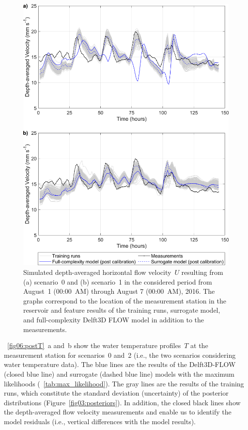 \documentclass[draft,linenumbers,onecolumn]{agujournal2019} %
\begin{document}
\begin{figure}
	\centering
	\includegraphics[width=14.5cm]{post-U-xscenario.png} 
	\caption{Simulated depth-averaged horizontal flow velocity~$U$ resulting from (a) scenario~0 and (b) scenario~1 in the considered period from August~1 (00:00~AM) through August 7 (00:00~AM), 2016. The graphs correspond to the location of the measurement station in the reservoir and feature results of the training runs, surrogate model, and full-complexity Delft3D FLOW model in addition to the measurements.}
	\label{fig05:postU}
\end{figure}

\figurename{~\ref{fig06:postT}}~a and~b show the water temperature profiles~$T$ at the measurement station for scenarios~0 and~2 (i.e., the two scenarios considering water temperature data). The blue lines are the results of the Delft3D-FLOW (closed blue line) and surrogate (dashed blue line) models with the maximum likelihoods (\tablename{~\ref{tab:max_likelihood}}). The gray lines are the results of the training runs, which constitute the standard deviation (uncertainty) of the posterior distributions (Figure~\ref{fig03:posteriors}). In addition, the closed black lines show the depth-averaged flow velocity measurements and enable us to identify the model residuals (i.e., vertical differences with the model results).
\end{document}
